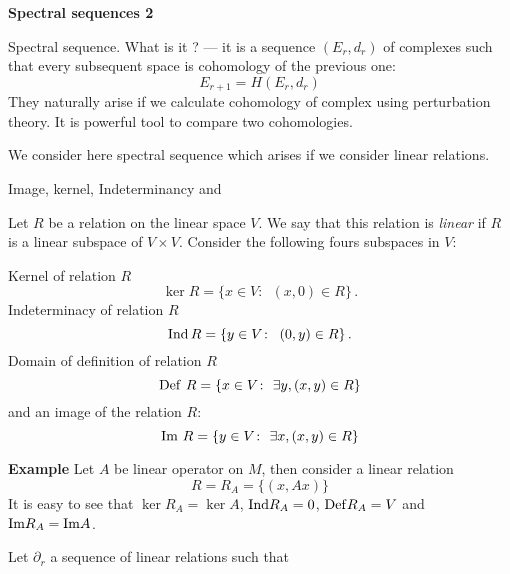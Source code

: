 \def\m {\smallskip}
\def \G {{\cal G}}
\def \p {\partial}
\def \t {\tilde}
\def \a  {\alpha}
\def \d  {\delta}
\def \L {\Lambda}
\def \drightarrow {\buildrel{\der}\over\longrightarrow}
\def \der {d_{_{E.L}}}
\def \C   {{\cal C}}
\def \B   {\overline}
\def \V {{\cal V}}
\def \vsubs {\cap\phantom{\vrule height2mm depth0mm width0.4pt}
                  \vrule height2mm depth0mm width0.4pt}
\def\interv{\phantom{\vrule height6mm depth0mm width0.4pt}}
\def\intervs{\phantom{\vrule height4mm depth0mm width0.4pt}}

\def \U {{\cal U}}
\def \P {{\cal P}}
\def \Ga {\Gamma}
\def \min {{\cal n}}
\def \dR  {{\bf R}}
\def \R  {{\bf R}}
\def \vare {\varepsilon}
\def \Hs {H^1(\G,\L^0(M))}


\def\Postn{16}

     \centerline {\bf Spectral sequences 2}

  Spectral sequence. What is it ? --- it is a sequence $(E_r,d_r)$
  of complexes such that every subsequent space is cohomology of the
  previous one:
                 $$
              E_{r+1}=H(E_r,d_r)
                 $$
They naturally arise if we calculate cohomology of complex using
perturbation theory.  It is powerful tool to compare two cohomologies.

 We consider here spectral sequence which arises if we consider linear relations.

  \centerline {Image, kernel, Indeterminancy and }
  Let $R$ be a relation on the linear space $V$. We say that this relation is {\it linear}
  if $R$ is a linear subspace of $V\times V$.
 Consider the following fours subspaces in $V$:

 Kernel of relation  $R$
          $$
  \ker R=\{x\in V\colon \,\,\, (x,0)\in R\}\,.
          $$
 Indeterminacy of relation $R$
          $$
  {\rm Ind\,}R=\{y\in V\colon\,\,\, (0,y)\in R\}\,.
          $$
  Domain of definition of relation $R$
          $$
  {\rm  Def\,\,} R=\{x\in V\colon\,\,\exists y, (x,y)\in R\}
           $$
      and an image of the relation $R$:
           $$
         {\rm  Im\,\,} R=\{y\in V\colon\,\,\exists x, (x,y)\in R\}
           $$

{\bf Example} Let $A$ be linear operator on $M$, then consider a linear relation
        $$
   R=R_A=\{(x,Ax)\}
        $$
 It is easy to see that $\ker R_A=\ker A$, ${\rm Ind} R_A=0$, ${\rm Def} R_A=V$ and ${\rm Im} R_A={\rm Im} A$.

 Let $\p_r$ a sequence of linear relations such that


\bye
